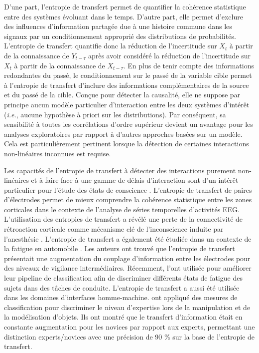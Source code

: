 D'une part, l'entropie de transfert permet de quantifier la cohérence statistique entre des systèmes évoluant dans le temps. 
D'autre part, elle permet d'exclure des influences d'information partagée due à une histoire commune dans les signaux par un conditionnement approprié des distributions de probabilités. 
L'entropie de transfert quantifie donc la réduction de l'incertitude sur $X_t$ à partir de la connaissance de $Y_{t-\tau}$ après avoir considéré la réduction de l'incertitude sur $X_t$ à partir de la connaissance de $X_{t-\tau}$. 
En plus de tenir compte des informations redondantes du passé, le conditionnement sur le passé de la variable cible permet à l'entropie de transfert d'inclure des informations complémentaires de la source et du passé de la cible. 
Conçue pour détecter la causalité, elle ne suppose par principe aucun modèle particulier d'interaction entre les deux systèmes d'intérêt (\textit{i.e.}, aucune hypothèse à priori sur les distributions). 
Par conséquent, sa sensibilité à toutes les corrélations d'ordre supérieur devient un avantage pour les analyses exploratoires par rapport à d'autres approches basées sur un modèle. 
Cela est particulièrement pertinent lorsque la détection de certaines interactions non-linéaires inconnues est requise. 

Les capacités de l'entropie de transfert à détecter des interactions purement non-linéaires et à faire face à une gamme de délais d'interaction sont d'un intérêt particulier pour l'étude des états de conscience \citep{vicente2011transfer, king2014characterizingthesis}. 
L'entropie de transfert de paires d'électrodes permet de mieux comprendre la cohérence statistique entre les zones corticales dans le contexte de l'analyse de séries temporelles d'activités EEG. 
L'utilisation des entropies de transfert a révélé une perte de la connectivité de rétroaction corticale comme mécanisme clé de l'inconscience induite par l'anesthésie \citep{ranft2016neural}. 
L'entropie de transfert a également été étudiée dans un contexte de la fatigue en automobile \citep{huang2015identifying}. 
Les auteurs ont trouvé que l'entropie de transfert présentait une augmentation du couplage d'information entre les électrodes pour des niveaux de vigilance intermédiaires. 
Récemment, \cite{gao2018relative} l'ont utilisée pour améliorer leur pipeline de classification afin de discriminer différents états de fatigue des sujets dans des tâches de conduite. 
L'entropie de transfert a aussi été utilisée dans les domaines d'interfaces homme-machine. 
\cite{baig2019connectivity} ont appliqué des mesures de classification pour discriminer le niveau d'expertise lors de la manipulation et de la modélisation d'objets. 
Ils ont montré que le transfert d'information était en constante augmentation pour les novices par rapport aux experts, permettant une distinction experts/novices avec une précision de 90 \% sur la base de l'entropie de transfert. 

